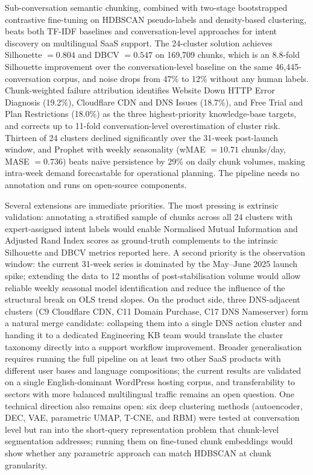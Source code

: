 \documentclass[conference]{IEEEtran}
\begin{document}
Sub-conversation semantic chunking, combined with two-stage bootstrapped contrastive fine-tuning on HDBSCAN pseudo-labels and density-based clustering, beats both TF-IDF baselines and conversation-level approaches for intent discovery on multilingual SaaS support. The 24-cluster solution achieves Silhouette $= 0.804$ and DBCV $= 0.547$ on 169{,}709 chunks, which is an 8.8-fold Silhouette improvement over the conversation-level baseline on the same 46{,}445-conversation corpus, and noise drops from 47\% to 12\% without any human labels. Chunk-weighted failure attribution identifies Website Down HTTP Error Diagnosis (19.2\%), Cloudflare CDN and DNS Issues (18.7\%), and Free Trial and Plan Restrictions (18.0\%) as the three highest-priority knowledge-base targets, and corrects up to 11-fold conversation-level overestimation of cluster risk. Thirteen of 24 clusters declined significantly over the 31-week post-launch window, and Prophet with weekly seasonality (wMAE $= 10.71$ chunks/day, MASE $= 0.736$) beats naive persistence by 29\% on daily chunk volumes, making intra-week demand forecastable for operational planning. The pipeline needs no annotation and runs on open-source components.

Several extensions are immediate priorities. The most pressing is extrinsic validation: annotating a stratified sample of chunks across all 24 clusters with expert-assigned intent labels would enable Normalised Mutual Information and Adjusted Rand Index scores as ground-truth complements to the intrinsic Silhouette and DBCV metrics reported here. A second priority is the observation window: the current 31-week series is dominated by the May--June 2025 launch spike; extending the data to 12 months of post-stabilisation volume would allow reliable weekly seasonal model identification and reduce the influence of the structural break on OLS trend slopes. On the product side, three DNS-adjacent clusters (C9 Cloudflare CDN, C11 Domain Purchase, C17 DNS Nameserver) form a natural merge candidate: collapsing them into a single DNS action cluster and handing it to a dedicated Engineering KB team would translate the cluster taxonomy directly into a support workflow improvement. Broader generalisation requires running the full pipeline on at least two other SaaS products with different user bases and language compositions; the current results are validated on a single English-dominant WordPress hosting corpus, and transferability to sectors with more balanced multilingual traffic remains an open question. One technical direction also remains open: six deep clustering methods (autoencoder, DEC, VAE, parametric UMAP, T-CNE, and RBM) were tested at conversation level but ran into the short-query representation problem that chunk-level segmentation addresses; running them on fine-tuned chunk embeddings would show whether any parametric approach can match HDBSCAN at chunk granularity.
\end{document}

